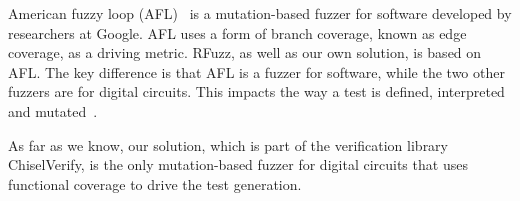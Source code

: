 \documentclass[conference]{IEEEtran}
\newcommand{\rewrite}[1]{{\color{red} rewrite: #1}}
\begin{document}
American fuzzy loop (AFL)~\cite{afl:repo} is a mutation-based fuzzer for software developed by researchers at Google. 
AFL uses a form of branch coverage, known as edge coverage, as a driving metric.
RFuzz, as well as our own solution, is based on AFL. 
The key difference is that AFL is a fuzzer for software, while the two other fuzzers are for digital circuits.
This impacts the way a test is defined, interpreted and mutated~\cite{rfuzz2018}.

As far as we know, our solution, which is part of the verification library ChiselVerify, is the only mutation-based fuzzer for digital circuits that uses functional coverage to drive the test generation.

\end{document}
